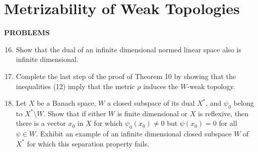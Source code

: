 \section{Metrizability of Weak Topologies}
\begin{center}
	\textbf{PROBLEMS}
\end{center}
\begin{enumerate}
	\setcounter{enumi}{15}
    \item Show that the dual of an infinite dimensional normed linear space also is infinite dimensional.
    \item Complete the last step of the proof of Theorem 10 by showing that the inequalities (12) imply that the metric $\rho$ induces the $W$-weak topology.
    \item Let $X$ be a Banach space, $W$ a closed subspace of its dual $X^*$, and $\psi_0$ belong to $X^*\setminus W$.
    Show that if either $W$ is finite dimensional or $X$ is reflexive, then there is a vector $x_0$ in $X$ for which $\psi_0(x_0)\neq0$ but $\psi(x_0)=0$ for all $\psi\in W$.
    Exhibit an example of an infinite dimensional closed subspace $W$ of $X^*$ for which this separation property fails.
\end{enumerate}
